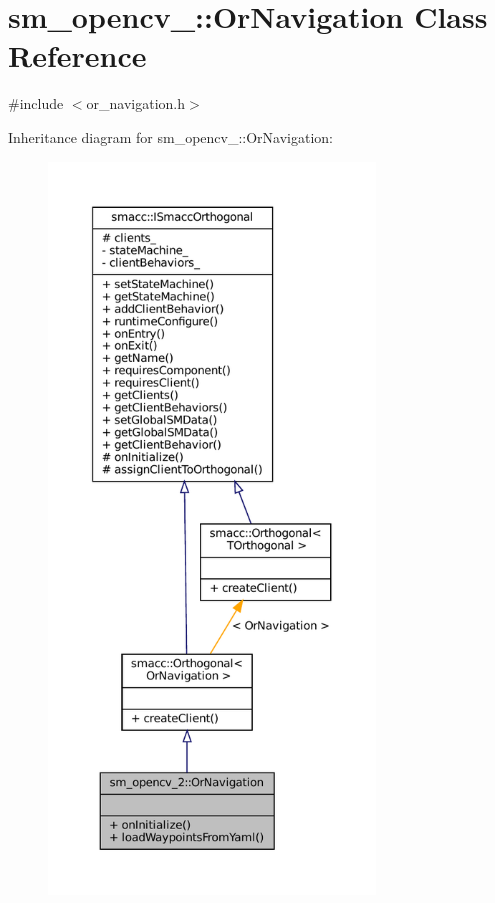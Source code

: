 \hypertarget{classsm__opencv__2_1_1OrNavigation}{}\section{sm\+\_\+opencv\+\_\+:\+:Or\+Navigation Class Reference}
\label{classsm__opencv__2_1_1OrNavigation}


{\ttfamily \#include $<$or\+\_\+navigation.\+h$>$}



Inheritance diagram for sm\+\_\+opencv\+\_\+:\+:Or\+Navigation\+:
\nopagebreak
\begin{figure}[H]
\begin{center}
\leavevmode
\includegraphics[height=550pt]{classsm__opencv__2_1_1OrNavigation__inherit__graph}
\end{center}
\end{figure}


